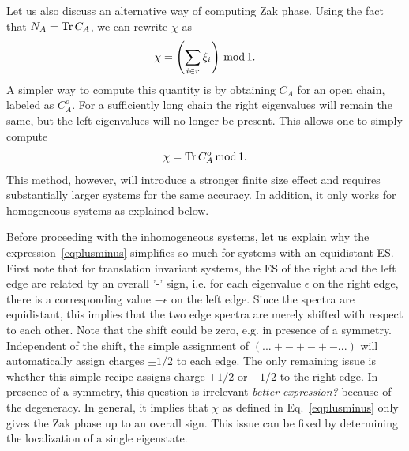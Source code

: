 \documentclass[twocolumn,amsmath,longbibliography,amssymb,superscriptaddress]{revtex4-1}
\newcommand{\mariac}[1]{{\it\color{cyan}#1}}
\begin{document}
Let us also discuss an alternative way of computing Zak phase. 
Using the fact that $N_A = \Tr C_A$, we can rewrite $\chi$ as
\begin{equation}
\chi = \left(\sum_{i\in r} \xi_i\right) \, {\rm mod} \, 1.
\label{eq:chihom}
\end{equation}
A simpler way to compute this quantity is by obtaining $C_A$ for an open chain, labeled as $C_A^{ o}$. 
For a sufficiently long  chain the right eigenvalues will remain the same, %
but the left eigenvalues will no longer be present. 
This allows one to simply compute
\begin{equation}
\chi = \Tr C_A^{o} \, {\rm mod} \, 1.
\end{equation}
This method, however, will introduce a stronger finite size effect and requires substantially larger systems for the same accuracy. 
In addition, it only works for homogeneous systems as explained below. 


Before proceeding with the inhomogeneous systems, let us explain why the expression~\eqref{eqplusminus} simplifies so much for systems with an equidistant ES. 
First note that for translation invariant systems, the ES of the right and the left edge are related by an overall '-' sign, i.e. for each eigenvalue $\epsilon$ on the right edge, there is a corresponding value $-\epsilon$ on the left edge. 
Since the spectra are equidistant, this implies that the two edge spectra are merely shifted with respect to each other.
Note that  the shift could be zero, e.g.  in presence of a symmetry. 
Independent of the shift, the simple assignment of $ (...+-+-+-...)$ will automatically assign charges $\pm 1/2$ to each edge. 
The only remaining issue is whether this simple recipe assigns charge $+1/2$ or $-1/2$ to the right edge.
In presence of a symmetry, this question is irrelevant \mariac{better expression?} because of the degeneracy. 
In general, it implies that $\chi$ as defined in Eq.~\eqref{eqplusminus} only gives the Zak phase up to an overall sign. 
This issue can be fixed by determining the localization of a single eigenstate. 

\end{document}
